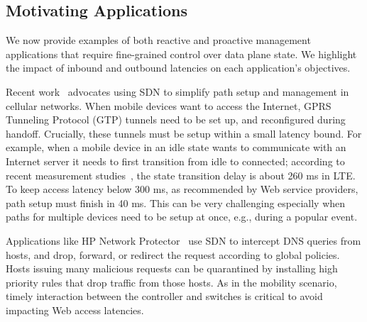 \iffalse
\subsection{Motivating Applications}
\label{s:apps}

We now provide examples of both reactive and proactive management
applications that require fine-grained control over data plane state. We
highlight the impact of inbound and outbound latencies on each application's
objectives.

 Recent work~\cite{softcell} advocates using
SDN to simplify path setup and management in cellular networks. When
mobile devices want to access the Internet, GPRS Tunneling Protocol (GTP) 
tunnels need to be set up, and reconfigured during handoff.
Crucially, these tunnels must be setup within a small latency bound. For 
example, when a mobile device in an idle state wants to communicate with an
Internet server it needs to first transition from idle to connected;
according to recent measurement studies~\cite{MorleyMobisys2012}, the
state transition delay is about 260 ms in LTE. To keep access latency
below 300 ms, as recommended by Web service providers, path setup must
finish in 40 ms. This can be very challenging especially when paths
for multiple devices need to be setup at once, e.g., during a popular
event.
    
Applications like HP Network Protector~\cite{netprotect} use SDN to
intercept DNS queries from hosts, and drop, forward, or
redirect the request according to global policies. Hosts issuing
many malicious requests can be quarantined by installing high priority rules
that drop traffic from those hosts. As in the mobility scenario, timely
interaction between the controller and switches is critical to avoid 
impacting Web access latencies.

